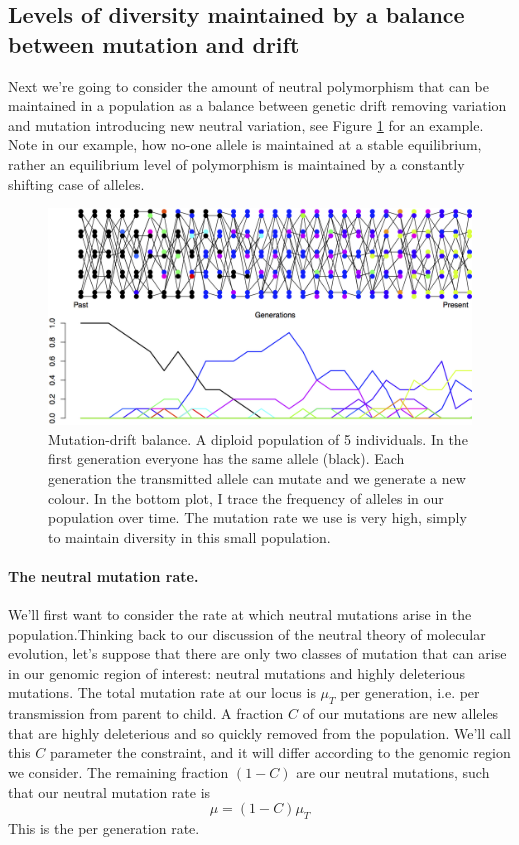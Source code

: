 \subsection{Levels of diversity maintained by a balance between
 mutation and drift} \label{DriftMutationBalance}

Next we're going to consider the amount of neutral polymorphism that can be maintained in a population as a balance between genetic drift removing variation and mutation introducing new neutral variation, see Figure \ref{fig:Mut_Sel_balance} for an example. Note in our example, how no-one allele is maintained at a stable equilibrium, rather an equilibrium level of polymorphism is maintained by a constantly shifting case of alleles. 

\begin{figure} \begin{center} \includegraphics[width= 0.8
\textwidth]{figures/Mut_drift_balance.png} \end{center} \caption{Mutation-drift
balance. A diploid population of 5 individuals. In the first generation
everyone has the same allele (black). Each generation the transmitted allele
can mutate and we generate a new colour. In the bottom plot, I trace the
frequency of alleles in our population over time. The mutation rate we use is very high, simply to maintain diversity in this small population.} \label{fig:Mut_Sel_balance}
\end{figure} 

\paragraph{The neutral mutation rate.} 
We'll first want to consider the rate at which neutral mutations arise in the population.Thinking back to our discussion of the neutral theory of molecular evolution, let's suppose that there are only two classes of mutation that can arise in our genomic region of interest: neutral mutations and highly deleterious mutations. The total mutation rate at our locus is $\mu_T$ per generation, i.e. per transmission from parent to child. A fraction $C$ of our mutations are new alleles that are highly deleterious and so quickly removed from the population. We'll call this $C$ parameter the constraint, and it will differ according to the genomic region we consider.  The remaining fraction $(1-C)$ are our neutral mutations, such that our neutral mutation rate is 
\begin{equation}
\mu = (1-C) \mu_T
\end{equation}
This is the per generation rate.

